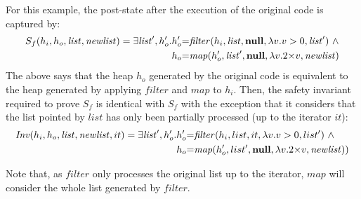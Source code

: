\documentclass[runningheads,a4paper]{llncs}
\begin{document}
For this example, the post-state after the execution of the original code is
captured by:
\begin{align*}
 S_f(h_i,h_o,\mathit{list},\mathit{newlist})  = \exists \mathit{list}', h_o'.  
  &h_o' {=} \mathit{filter}(h_i, \mathit{list}, \mathbf{null}, \lambda v. v>0, \mathit{list}')~\wedge\\
  &h_o {=} \mathit{map}(h_o', \mathit{list}', \mathbf{null}, \lambda v. 2 {\times} v, \mathit{newlist})
\end{align*}
%
%
The above says that the heap $h_o$ generated by the original code is
equivalent to the heap generated by applying $\mathit{filter}$ and
$\mathit{map}$ to $h_i$.  Then, the safety invariant required to prove
$S_f$ is identical with $S_f$ with the exception that it
considers that the list pointed by $\mathit{list}$ has only been partially
processed (up to the iterator $\mathit{it}$):
%
\begin{align*}
  \mathit{Inv}(h_i,h_o,\mathit{list},\mathit{newlist},it)  = \exists \mathit{list}', h_o'.
  & h_o' {=} \mathit{filter}(h_i, list, it, \lambda v. v>0, list') ~\wedge \\
& h_o {=} \mathit{map}(h_o', list', \mathbf{null}, \lambda v. 2 {\times} v, \mathit{newlist}))
\end{align*}

Note that, as $\mathit{filter}$ only processes the original list up to the
iterator, $\mathit{map}$ will consider the whole list generated by $\mathit{filter}$.
%
%


\end{document}
